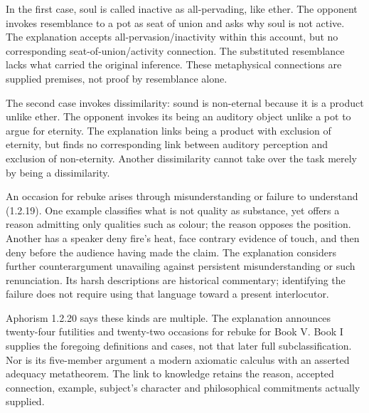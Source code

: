 In the first case, soul is called inactive as all-pervading, like ether.
The opponent invokes resemblance to a pot as seat of union and asks
why soul is not active. The explanation accepts all-pervasion/inactivity
within this account, but no corresponding seat-of-union/activity connection.
The substituted resemblance lacks what carried the original inference.
These metaphysical connections are supplied premises, not proof by
resemblance alone.

The second case invokes dissimilarity: sound is non-eternal because it is
a product unlike ether. The opponent invokes its being an auditory object
unlike a pot to argue for eternity. The explanation links being a product
with exclusion of eternity, but finds no corresponding link between
auditory perception and exclusion of non-eternity. Another dissimilarity
cannot take over the task merely by being a dissimilarity.

An occasion for rebuke arises through misunderstanding or failure to
understand (1.2.19). One example classifies what is not quality as substance,
yet offers a reason admitting only qualities such as colour; the reason
opposes the position. Another has a speaker deny fire's heat, face contrary
evidence of touch, and then deny before the audience having made the claim.
The explanation considers further counterargument unavailing against
persistent misunderstanding or such renunciation. Its harsh descriptions
are historical commentary; identifying the failure does not require using
that language toward a present interlocutor.

Aphorism 1.2.20 says these kinds are multiple. The explanation announces
twenty-four futilities and twenty-two occasions for rebuke for Book V.
Book I supplies the foregoing definitions and cases, not that later full
subclassification. Nor is its five-member argument a modern axiomatic
calculus with an asserted adequacy metatheorem. The link to knowledge
retains the reason, accepted connection, example, subject's character
and philosophical commitments actually supplied.
